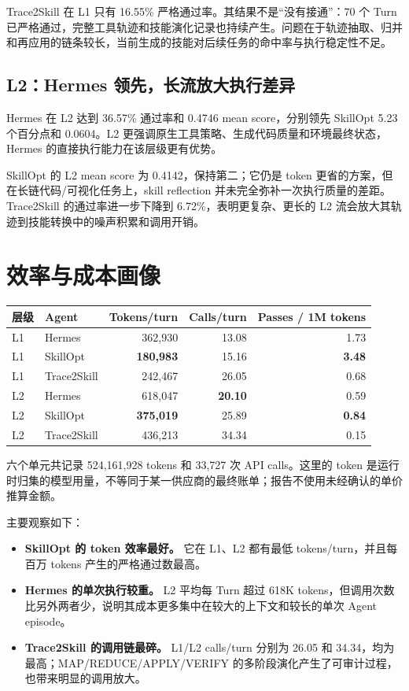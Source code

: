 \documentclass[11pt,a4paper]{article}
\begin{document}
Trace2Skill 在 L1 只有 16.55\% 严格通过率。其结果不是“没有接通”：70 个 Turn 已严格通过，完整工具轨迹和技能演化记录也持续产生。问题在于轨迹抽取、归并和再应用的链条较长，当前生成的技能对后续任务的命中率与执行稳定性不足。

\subsection{L2：Hermes 领先，长流放大执行差异}

Hermes 在 L2 达到 36.57\% 通过率和 0.4746 mean score，分别领先 SkillOpt 5.23 个百分点和 0.0604。L2 更强调原生工具策略、生成代码质量和环境最终状态，Hermes 的直接执行能力在该层级更有优势。

SkillOpt 的 L2 mean score 为 0.4142，保持第二；它仍是 token 更省的方案，但在长链代码/可视化任务上，skill reflection 并未完全弥补一次执行质量的差距。Trace2Skill 的通过率进一步下降到 6.72\%，表明更复杂、更长的 L2 流会放大其轨迹到技能转换中的噪声积累和调用开销。

\section{效率与成本画像}

\begin{center}
\renewcommand{\arraystretch}{1.22}
\begin{tabular}{llrrr}
\toprule
层级 & Agent & Tokens/turn & Calls/turn & Passes / 1M tokens \\
\midrule
L1 & Hermes & 362,930 & 13.08 & 1.73 \\
L1 & SkillOpt & \textbf{180,983} & 15.16 & \textbf{3.48} \\
L1 & Trace2Skill & 242,467 & 26.05 & 0.68 \\
\midrule
L2 & Hermes & 618,047 & \textbf{20.10} & 0.59 \\
L2 & SkillOpt & \textbf{375,019} & 25.89 & \textbf{0.84} \\
L2 & Trace2Skill & 436,213 & 34.34 & 0.15 \\
\bottomrule
\end{tabular}
\end{center}

六个单元共记录 524,161,928 tokens 和 33,727 次 API calls。这里的 token 是运行时归集的模型用量，不等同于某一供应商的最终账单；报告不使用未经确认的单价推算金额。

主要观察如下：

\begin{itemize}
\item \textbf{SkillOpt 的 token 效率最好。} 它在 L1、L2 都有最低 tokens/turn，并且每百万 tokens 产生的严格通过数最高。
\item \textbf{Hermes 的单次执行较重。} L2 平均每 Turn 超过 618K tokens，但调用次数比另外两者少，说明其成本更多集中在较大的上下文和较长的单次 Agent episode。
\item \textbf{Trace2Skill 的调用链最碎。} L1/L2 calls/turn 分别为 26.05 和 34.34，均为最高；MAP/REDUCE/APPLY/VERIFY 的多阶段演化产生了可审计过程，也带来明显的调用放大。
\end{itemize}
\end{document}

